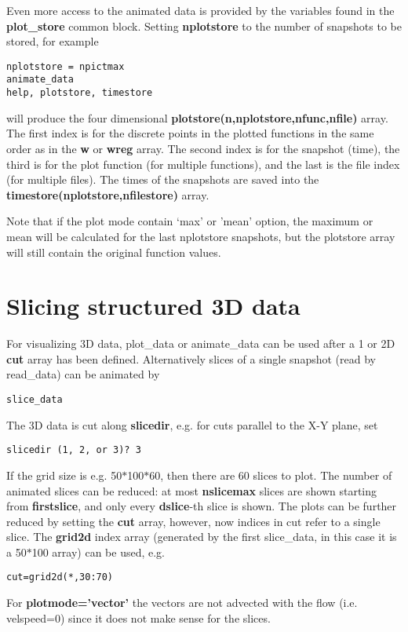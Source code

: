 \documentclass{article}
\begin{document}
   Even more access to the animated data is provided by the variables found in the
   {\bf plot\_store} common block. Setting {\bf nplotstore}
   to the number of snapshots to be stored, for example
\begin{verbatim}
nplotstore = npictmax
animate_data
help, plotstore, timestore
\end{verbatim}
   will produce the four dimensional {\bf plotstore(n,nplotstore,nfunc,nfile)} array.
   The first index is for the discrete points in the plotted functions in the
   same order as in the {\bf w} or {\bf wreg} array.
   The second index is for the snapshot (time), the third is for the
   plot function (for multiple functions), and the last is the file index 
   (for multiple files).
   The times of the snapshots are saved into the {\bf timestore(nplotstore,nfilestore)}
   array. 

   Note that if the plot mode contain `max' or 'mean' option, the 
   maximum or mean will be calculated for the last nplotstore snapshots,
   but the plotstore array will still contain the original function values.

\section{Slicing structured 3D data \label{s-slice}}

   For visualizing 3D data, plot\_data or animate\_data can be used after a
   1 or 2D {\bf cut} array has been defined. Alternatively slices of a single
   snapshot (read by read\_data) can be animated by
\begin{verbatim}
slice_data
\end{verbatim}
   The 3D data is cut along {\bf slicedir}, e.g. for cuts parallel to the
   X-Y plane, set
\begin{verbatim}
slicedir (1, 2, or 3)? 3
\end{verbatim}
   If the grid size is e.g. 50$*$100$*$60, then there are 60 slices to plot.
   The number of animated slices can be reduced:
   at most {\bf nslicemax} slices are shown starting from {\bf firstslice},
   and only every {\bf dslice}-th slice is shown.
   The plots can be further reduced by setting the {\bf cut} array,
   however, now indices in cut refer to a single slice. The {\bf grid2d} 
   index array (generated by the first slice\_data, in this case it is a 50$*$100 
   array) can be used, e.g.
\begin{verbatim}
cut=grid2d(*,30:70)
\end{verbatim}
   For {\bf plotmode='vector'} the vectors are not advected with the flow 
   (i.e. velspeed=0) since it does not make sense for the slices.
\end{document}
